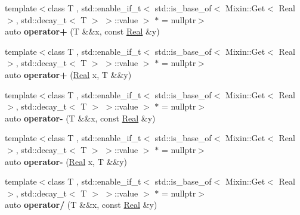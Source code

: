 \begin{DoxyCompactItemize}
\item 
\hypertarget{namespaceSpacy_a00adbd58a88f8474c28da323effbcc26}{{\footnotesize template$<$class T , std\-::enable\-\_\-if\-\_\-t$<$ std\-::is\-\_\-base\-\_\-of$<$ Mixin\-::\-Get$<$ Real $>$, std\-::decay\-\_\-t$<$ T $>$ $>$\-::value $>$ $\ast$  = nullptr$>$ }\\auto {\bfseries operator+} (T \&\&x, const \hyperlink{classSpacy_1_1Real}{Real} \&y)}\label{namespaceSpacy_a00adbd58a88f8474c28da323effbcc26}

\item 
\hypertarget{namespaceSpacy_af24641d6a51293d3601c760ec310a1b1}{{\footnotesize template$<$class T , std\-::enable\-\_\-if\-\_\-t$<$ std\-::is\-\_\-base\-\_\-of$<$ Mixin\-::\-Get$<$ Real $>$, std\-::decay\-\_\-t$<$ T $>$ $>$\-::value $>$ $\ast$  = nullptr$>$ }\\auto {\bfseries operator+} (\hyperlink{classSpacy_1_1Real}{Real} x, T \&\&y)}\label{namespaceSpacy_af24641d6a51293d3601c760ec310a1b1}

\item 
\hypertarget{namespaceSpacy_a0ce5976cd9ab32a6eecaa92fc3ea803a}{{\footnotesize template$<$class T , std\-::enable\-\_\-if\-\_\-t$<$ std\-::is\-\_\-base\-\_\-of$<$ Mixin\-::\-Get$<$ Real $>$, std\-::decay\-\_\-t$<$ T $>$ $>$\-::value $>$ $\ast$  = nullptr$>$ }\\auto {\bfseries operator-\/} (T \&\&x, const \hyperlink{classSpacy_1_1Real}{Real} \&y)}\label{namespaceSpacy_a0ce5976cd9ab32a6eecaa92fc3ea803a}

\item 
\hypertarget{namespaceSpacy_a92fe6ff3c620feb4c8299e6ac3959a42}{{\footnotesize template$<$class T , std\-::enable\-\_\-if\-\_\-t$<$ std\-::is\-\_\-base\-\_\-of$<$ Mixin\-::\-Get$<$ Real $>$, std\-::decay\-\_\-t$<$ T $>$ $>$\-::value $>$ $\ast$  = nullptr$>$ }\\auto {\bfseries operator-\/} (\hyperlink{classSpacy_1_1Real}{Real} x, T \&\&y)}\label{namespaceSpacy_a92fe6ff3c620feb4c8299e6ac3959a42}

\item 
\hypertarget{namespaceSpacy_aeec0910b94a07ae8dfe79f971ea8425a}{{\footnotesize template$<$class T , std\-::enable\-\_\-if\-\_\-t$<$ std\-::is\-\_\-base\-\_\-of$<$ Mixin\-::\-Get$<$ Real $>$, std\-::decay\-\_\-t$<$ T $>$ $>$\-::value $>$ $\ast$  = nullptr$>$ }\\auto {\bfseries operator/} (T \&\&x, const \hyperlink{classSpacy_1_1Real}{Real} \&y)}\label{namespaceSpacy_aeec0910b94a07ae8dfe79f971ea8425a}


\end{DoxyCompactItemize}
